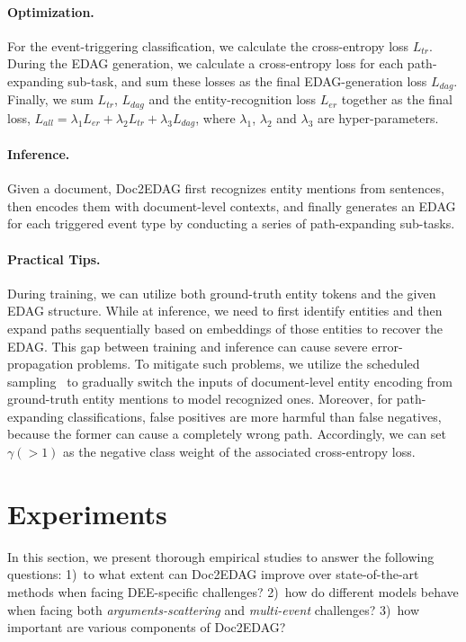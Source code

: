 \documentclass[11pt,a4paper]{article}
\begin{document}
\paragraph{Optimization.}
For the event-triggering classification, we calculate the cross-entropy loss $L_{tr}$.
During the EDAG generation, we calculate a cross-entropy loss for each path-expanding sub-task, and sum these losses as the final EDAG-generation loss $L_{dag}$.
Finally, we sum $L_{tr}$, $L_{dag}$ and the entity-recognition loss $L_{er}$ together as the final loss, $L_{all} = \lambda_1 L_{er} + \lambda_2 L_{tr} + \lambda_3 L_{dag}$, where $\lambda_1$, $\lambda_2$ and $\lambda_3$ are hyper-parameters.

\paragraph{Inference.}
Given a document, Doc2EDAG first recognizes entity mentions from sentences, 
then encodes them with document-level contexts, 
and finally generates an EDAG for each triggered event type by conducting a series of path-expanding sub-tasks.

\paragraph{Practical Tips.}
During training, we can utilize both ground-truth entity tokens and the given EDAG structure.
While at inference, we need to first identify entities and then expand paths sequentially based on embeddings of those entities to recover the EDAG.
This gap between training and inference can cause severe error-propagation problems.
To mitigate such problems, we utilize the scheduled sampling~\cite{bengio2015scheduled} to gradually switch the inputs of document-level entity encoding from ground-truth entity mentions to model recognized ones.
Moreover, for path-expanding classifications, false positives are more harmful than false negatives, because the former can cause a completely wrong path. Accordingly, we can set $\gamma (> 1)$ as the negative class weight of the associated cross-entropy loss.



\section{Experiments}
In this section, we present thorough empirical studies to answer the following questions:
1)~to what extent can Doc2EDAG improve over state-of-the-art methods when facing DEE-specific challenges?
2)~how do different models behave when facing both \textit{arguments-scattering} and \textit{multi-event} challenges?
3)~how important are various components of Doc2EDAG?
\end{document}
